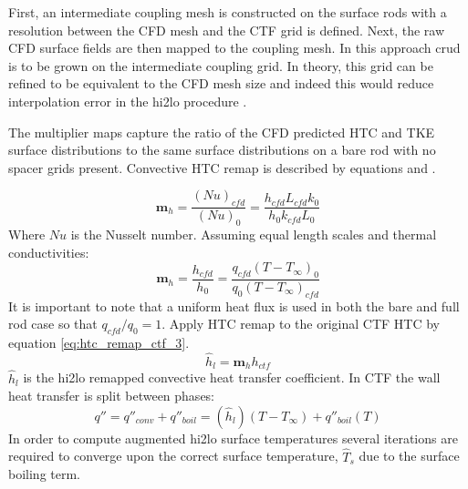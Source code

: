     First, an intermediate coupling mesh is constructed on the surface rods with a resolution between the CFD mesh and the CTF grid is defined.  Next, the raw CFD surface fields are then mapped to the coupling mesh.  In this approach crud is to be grown on the intermediate coupling grid.  In theory, this grid can be refined to be equivalent to the CFD mesh size and indeed this would reduce interpolation error in the hi2lo procedure \cite{salko17}.
       
    The multiplier maps capture the ratio of the CFD predicted HTC and TKE surface distributions to the same surface distributions on a bare rod with no spacer grids present.
    Convective HTC remap is described by equations \label{eq:htc_remap_ctf_1} and \label{eq:htc_remap_ctf_2}.
    
    \begin{equation}
        \mathbf m_h = \frac{(Nu)_{cfd}}{(Nu)_{0}} = \frac{h_{cfd} L_{cfd} k_{0} }{h_{0}k_{cfd} L_{0}}
         \label{eq:htc_remap_ctf_1}
    \end{equation}
    Where $Nu$ is the Nusselt number.  Assuming equal length scales and thermal conductivities:
    \begin{equation}
        \mathbf m_h = \frac{h_{cfd}}{h_{0}} = \frac{q_{cfd}(T-T_\infty)_{0}}{q_{0}(T-T_\infty)_{cfd}}
        \label{eq:htc_remap_ctf_2}
    \end{equation}
    It is important to note that a uniform heat flux is used in both the bare and full rod case so that $q_{cfd}/q_0 =1 $.
    Apply HTC remap to the original CTF HTC by equation \ref{eq:htc_remap_ctf_3}.
    \begin{equation}
        \hat h_{l} = \mathbf m_h h_{ctf}
        \label{eq:htc_remap_ctf_3}
    \end{equation}
    $\hat h_l$ is the hi2lo remapped convective heat transfer coefficient.  In CTF the wall heat transfer is split between phases:
    \begin{equation}
        q'' = q''_{conv} + q''_{boil} = (\hat h_l)(T-T_{\infty}) + q''_{boil}(T)
    \end{equation}
    In order to compute augmented hi2lo surface temperatures
    several iterations are required to converge upon the correct surface temperature, $\hat T_s$ due to the surface boiling term.

